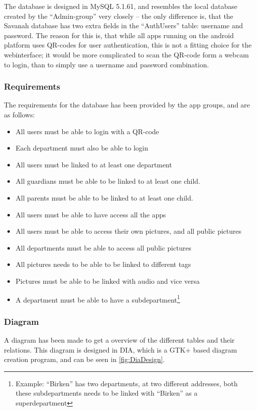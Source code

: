 The database is designed in MySQL 5.1.61, and resembles the local database created by the ``Admin-group'' very closely -- the only difference is, that the Savanah database has two extra fields in the ``AuthUsers'' table: username and password. The reason for this is, that while all apps running on the android platform uses QR-codes for user authentication, this is not a fitting choice for the webinterface; it would be more complicated to scan the QR-code form a webcam to login, than to simply use a username and password combination.

\subsubsection{Requirements}
The requirements for the database has been provided by the app groups, and are as follows:

\begin{itemize}
	\item All users must be able to login with a QR-code
	\item Each department must also be able to login
	\item All users must be linked to at least one department
	\item All guardians must be able to be linked to at least one child.
	\item All parents must be able to be linked to at least one child.
	\item All users must be able to have access all the apps
	\item All users must be able to access their own pictures, and all public pictures
	\item All departments must be able to access all public pictures
	\item All pictures needs to be able to be linked to different tags
	\item Pictures must be able to be linked with audio and vice versa
	\item A department must be able to have a subdepartment\footnote{Example: ``Birken'' has two departments, at two different addresses, both these subdepartments needs to be linked with ``Birken'' as a superdepartment}
\end{itemize}

\subsubsection*{Diagram}
A diagram has been made to get a overview of the different tables and their relations. This diagram is designed in DIA, which is a GTK+ based diagram creation program\cite{Dia}, and can be seen in \autoref{fig:DiaDesign}.

